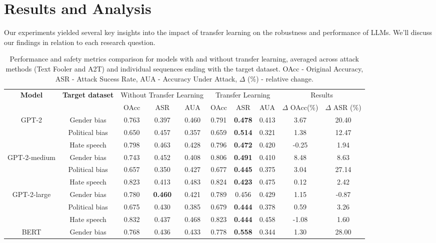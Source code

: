 \documentclass{article}
\begin{document}
\section{Results and Analysis}
Our experiments yielded several key insights into the impact of transfer learning on the robustness and performance of LLMs. We'll discuss our findings in relation to each research question.
\begin{table}[ht]
\centering
\scriptsize
\caption{Performance and safety metrics comparison for models with and without transfer learning, averaged across attack methods (Text Fooler and A2T) and individual sequences ending with the target dataset. OAcc - Original Accuracy, ASR - Attack Sucess Rate, AUA - Accuracy Under Attack, $\Delta$ (\%) - relative change. }

\begin{tabular}{c|c|ccc|ccc|cc}
\hline
\multirow{2}{*}{\textbf{Model}} & \multirow{2}{*}{\textbf{Target dataset}} & \multicolumn{3}{c|}{Without Transfer Learning} & \multicolumn{3}{c|}{Transfer Learning} & \multicolumn{2}{c}{Results} \\ \cline{3-10}
 &  & OAcc& ASR & AUA & OAcc& ASR & AUA & $\Delta$ OAcc(\%) & $\Delta$ ASR (\%) \\ \hline
\multirow{3}{*}{GPT-2} & Gender bias & 0.763 & 0.397 & 0.460 & 0.791 & \textbf{0.478} & 0.413 & 3.67 & 20.40 \\ 
 & Political bias & 0.650 & 0.457 & 0.357 & 0.659 & \textbf{0.514} & 0.321 & 1.38 & 12.47 \\ 
 & Hate speech & 0.798 & 0.463 & 0.428 & 0.796 & \textbf{0.472} & 0.420 & -0.25 & 1.94 \\ \hline
\multirow{3}{*}{GPT-2-medium} & Gender bias & 0.743 & 0.452 & 0.408 & 0.806 & \textbf{0.491} & 0.410 & 8.48 & 8.63 \\
 & Political bias & 0.657 & 0.350 & 0.427 & 0.677 & \textbf{0.445} & 0.375 & 3.04 & 27.14 \\ 
 & Hate speech & 0.823 & 0.413 & 0.483 & 0.824 & \textbf{0.423} & 0.475 & 0.12 & 2.42 \\ \hline
\multirow{3}{*}{GPT-2-large} & Gender bias & 0.780 & \textbf{0.460} & 0.421 & 0.789 & 0.456 & 0.429 & 1.15 & -0.87 \\ 
 & Political bias & 0.675 & 0.430 & 0.385 & 0.679 & \textbf{0.444} & 0.378 & 0.59 & 3.26 \\ 
 & Hate speech & 0.832 & 0.437 & 0.468 & 0.823 & \textbf{0.444} & 0.458 & -1.08 & 1.60 \\ \hline
\multirow{3}{*}{BERT} & Gender bias & 0.768 & 0.436 & 0.433 & 0.778 & \textbf{0.558} & 0.344 & 1.30 & 28.00 \\ 

\end{tabular}
\end{table}
\end{document}
